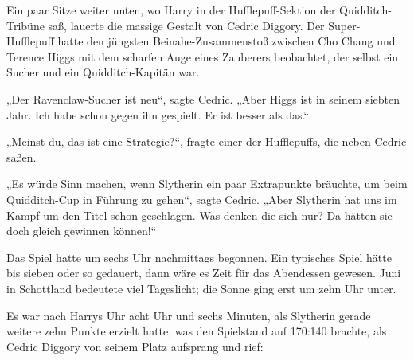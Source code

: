 Ein paar Sitze weiter unten, wo Harry in der Hufflepuff-Sektion der Quidditch-Tribüne saß, lauerte die massige Gestalt von Cedric Diggory. Der Super-Hufflepuff hatte den jüngsten Beinahe-Zusammenstoß zwischen Cho Chang und Terence Higgs mit dem scharfen Auge eines Zauberers beobachtet, der selbst ein Sucher und ein Quidditch-Kapitän war.

„Der Ravenclaw-Sucher ist neu“, sagte Cedric. „Aber Higgs ist in seinem siebten Jahr. Ich habe schon gegen ihn gespielt. Er ist besser als das.“

„Meinst du, das ist eine Strategie?“, fragte einer der Hufflepuffs, die neben Cedric saßen.

„Es würde Sinn machen, wenn Slytherin ein paar Extrapunkte bräuchte, um beim Quidditch-Cup in Führung zu gehen“, sagte Cedric. „Aber Slytherin hat uns im Kampf um den Titel schon geschlagen. Was denken die sich nur? Da hätten sie doch gleich gewinnen können!“

Das Spiel hatte um sechs Uhr nachmittags begonnen. Ein typisches Spiel hätte bis sieben oder so gedauert, dann wäre es Zeit für das Abendessen gewesen.
Juni in Schottland bedeutete viel Tageslicht; die Sonne ging erst um zehn Uhr unter.

Es war nach Harrys Uhr acht Uhr und sechs Minuten, als Slytherin gerade weitere zehn Punkte erzielt hatte, was den Spielstand auf 170:140 brachte, als Cedric Diggory von seinem Platz aufsprang und rief:

